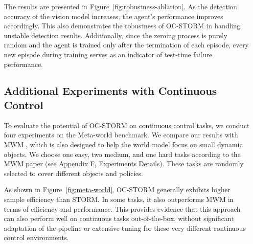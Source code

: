 \documentclass{article} %
\begin{document}
The results are presented in Figure~\ref{fig:robustness-ablation}.
As the detection accuracy of the vision model increases, the agent's performance improves accordingly.
This also demonstrates the robustness of OC-STORM in handling unstable detection results.
Additionally, since the zeroing process is purely random and the agent is trained only after the termination of each episode, every new episode during training serves as an indicator of test-time failure performance.

\subsection{Additional Experiments with Continuous Control} \label{sec:metaworld}

To evaluate the potential of OC-STORM on continuous control tasks, we conduct four experiments on the Meta-world \citep{yu_metaworld_2020} benchmark.
We compare our results with MWM \citep{seo_masked_2022}, which is also designed to help the world model focus on small dynamic objects.
We choose one easy, two medium, and one hard tasks according to the MWM paper (see \citet{seo_masked_2022} Appendix F, Experiments Details).
These tasks are randomly selected to cover different objects and policies.

As shown in Figure~\ref{fig:meta-world}, OC-STORM generally exhibits higher sample efficiency than STORM.
In some tasks, it also outperforms MWM in terms of efficiency and performance.
This provides evidence that this approach can also perform well on continuous tasks out-of-the-box, without significant adaptation of the pipeline or extensive tuning for these very different continuous control environments.
\end{document}
